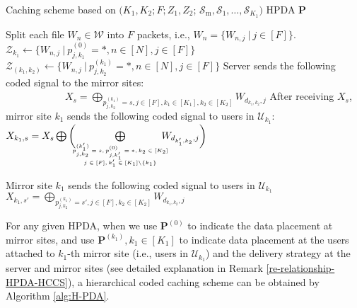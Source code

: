 \documentclass[onecolumn,10pt]{IEEEtran}
\theoremstyle{mythm}
\begin{document}
\begin{small}
\begin{algorithm}[http!]
	\caption{Caching scheme based on $(K_1,K_2;F;Z_1,Z_2$; $\mathcal{S}_\text{m},\mathcal{S}_1,\ldots,\mathcal{S}_{K_1})$ HPDA $\mathbf{P}$}\label{alg:H-PDA}
	\begin{algorithmic}[1]
		\State Split each file $W_n\in \mathcal{W}$ into $F$ packets, i.e., $W_{n}=\{W_{n,j}\ |\ j\in[F]\}$.
		\State $\mathcal{Z}_{k_1}\leftarrow\{W_{n,j}\ |\ p^{(0)}_{j,k_1}=*, n\in [N], j\in[F]\}$
		\EndFor
		\State $\mathcal{Z}_{(k_1,k_2)}\leftarrow\{W_{n,j}\ |\ p^{(k_1)}_{j,k_2}=*, n\in [N], j\in[F]\}$
		\EndFor
		\EndProcedure
		\State  Server sends the following coded signal to   the mirror sites: \\ \ \ \ \ \ \ \ \ \ \ \ \ $X_s=\bigoplus_{p^{(k_1)}_{j,k_2}=s,j\in[F],k_1\in[K_1],k_2\in[K_2]}W_{d_{k_1,k_2},j}$         \EndFor
		\EndProcedure
        \State After receiving $X_s$, mirror site $k_1$ sends the following coded signal  to users in $\mathcal{U}_{k_1}$:
		\State  $X_{k_1,s}=X_s\bigoplus\bigg(\!\!\!\!\!\!\bigoplus\limits_{
    \tiny\begin{array}{c}
    p^{(k'_1)}_{j,k_2}=s,p^{(0)}_{j,k'_1}=*,  k_2\in[K_2]\\
    j\in[F],k'_1\in [K_1]\backslash\{k_1\}
    \end{array}
    }\!\!\!\!\!\!\!\!W_{d_{k'_1,k_2},j}\bigg)$

		\EndFor
		\State Mirror site $k_1$  sends the following  coded signal to users in $\mathcal{U}_{k_1}$
		\State  \ \ \ \ \ \ \ \ $X_{k_1,s'}=\bigoplus_{p^{(k_1)}_{j,k_2}=s',j\in[F],k_2\in[K_2]}W_{d_{k_1,k_2},j}$
		\EndFor
		\EndProcedure
	\end{algorithmic}
\end{algorithm}
\end{small}
For any given HPDA, when we use $\mathbf{P}^{(0)}$ to indicate the data placement at mirror sites, and use $\mathbf{P}^{(k_1)}, k_1\in[K_1]$ to indicate data placement at the users attached to $k_1$-th mirror site (i.e., users in $\mathcal{U}_{k_1}$) and the delivery strategy at the server and mirror sites (see detailed explanation in Remark \ref{re-relationship-HPDA-HCCS}), a hierarchical coded caching scheme can be obtained by Algorithm \ref{alg:H-PDA}.
\end{document}
